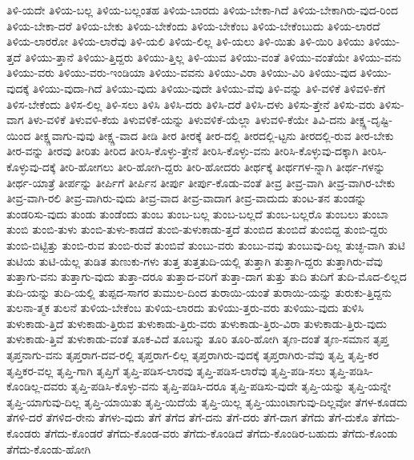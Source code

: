 {ತಿಳಿ-ಯದೇ
ತಿಳಿಯ-ಬಲ್ಲ
ತಿಳಿಯ-ಬಲ್ಲಂತಹ
ತಿಳಿಯ-ಬಾರದು
ತಿಳಿಯ-ಬೇಕಾ-ಗಿದೆ
ತಿಳಿಯ-ಬೇಕಾಗಿರು-ವುದ-ರಿಂದ
ತಿಳಿಯ-ಬೇಕಾ-ದರೆ
ತಿಳಿಯ-ಬೇಕು
ತಿಳಿಯ-ಬೇಕೆಂದು
ತಿಳಿಯ-ಬೇಕೆಂಬ
ತಿಳಿಯ-ಬೇಕೆಂಬುದು
ತಿಳಿಯ-ಲಾರದೆ
ತಿಳಿಯ-ಲಾರರೋ
ತಿಳಿಯ-ಲಾರೆವು
ತಿಳಿ-ಯಲಿ
ತಿಳಿಯ-ಲಿಲ್ಲ
ತಿಳಿ-ಯಲು
ತಿಳಿ-ಯಿತು
ತಿಳಿ-ಯಿರಿ
ತಿಳಿಯು
ತಿಳಿಯು-ತ್ತದೆ
ತಿಳಿಯು-ತ್ತಾನೆ
ತಿಳಿಯು-ತ್ತಿದ್ದರು
ತಿಳಿಯು-ತ್ತಿಲ್ಲ
ತಿಳಿ-ಯುವ
ತಿಳಿಯು-ವಂತೆ
ತಿಳಿಯು-ವಂತೆಯೇ
ತಿಳಿಯು-ವನು
ತಿಳಿಯು-ವರು
ತಿಳಿಯು-ವರು-ಇಂಡಿಯಾ
ತಿಳಿಯು-ವವನು
ತಿಳಿಯು-ವಿರಾ
ತಿಳಿಯು-ವಿರಿ
ತಿಳಿಯು-ವುದ
ತಿಳಿಯು-ವುದಕ್ಕೆ
ತಿಳಿಯು-ವುದಾ-ಗಿದೆ
ತಿಳಿಯು-ವುದು
ತಿಳಿಯು-ವುದೇ
ತಿಳಿಯು-ವೆವು
ತಿಳಿ-ವನ್ನು
ತಿಳಿ-ವಳಿಕೆ
ತಿಳಿವಳಿ-ಕೆಗೆ
ತಿಳಿಸ-ಬೇಕೆಂದು
ತಿಳಿಸ-ಲಿಲ್ಲ
ತಿಳಿ-ಸಲು
ತಿಳಿಸಿ
ತಿಳಿಸಿ-ದರು
ತಿಳಿಸಿ-ದರೆ
ತಿಳಿಸಿ-ದಳು
ತಿಳಿಸು-ತ್ತೇನೆ
ತಿಳಿಸು-ವರು
ತಿಳಿಸು-ವಾಗ
ತಿಳು-ವಳಿಕೆ
ತಿಳುವಳಿ-ಕೆಯ
ತಿಳುವಳಿಕೆ-ಯನ್ನು
ತಿಳುವಳಿಕೆ-ಯೆಲ್ಲಾ
ತಿಳುವಳಿ-ಕೆಯೇ
ತಿವಿ-ದನು
ತೀಕ್ಷ್ಣ-ದೃಷ್ಟಿ-ಯಿಂದ
ತೀಕ್ಷ್ಣವಾಗು-ವುವು
ತೀಕ್ಷ್ಣ-ವಾದ
ತೀಡಿ
ತೀರ
ತೀರಕ್ಕೆ
ತೀರ-ದಲ್ಲಿ
ತೀರದಲ್ಲಿ-ಟ್ಟನು
ತೀರದಲ್ಲಿ-ರುವ
ತೀರ-ಬೇಕು
ತೀರ-ವನ್ನು
ತೀರವು
ತೀರಿತು
ತೀರಿದ
ತೀರಿಸಿ-ಕೊಳ್ಳು-ತ್ತೇನೆ
ತೀರಿಸಿ-ಕೊಳ್ಳು-ವನು
ತೀರಿಸಿ-ಕೊಳ್ಳುವು-ದಕ್ಕಾಗಿ
ತೀರಿಸಿ-ಕೊಳ್ಳುವು-ದಕ್ಕೆ
ತೀರಿ-ಹೋಗಲು
ತೀರಿ-ಹೋಗಿ-ದ್ದರು
ತೀರಿ-ಹೋದರು
ತೀರ್ಥಕ್ಕೆ
ತೀರ್ಥಗಳ-ನ್ನಾಗಿ
ತೀರ್ಥ-ಗಳನ್ನು
ತೀರ್ಥ-ಯಾತ್ರೆ
ತೀರ್ಪನ್ನು
ತೀರ್ಪಿಗೆ
ತೀರ್ಪಿನ
ತೀರ್ಪು
ತೀರ್ಪು-ಕೊಡು-ವಂತೆ
ತೀವ್ರ
ತೀವ್ರ-ವಾಗಿ
ತೀವ್ರ-ವಾಗಿರ-ಬೇಕು
ತೀವ್ರ-ವಾಗಿ-ರಲಿ
ತೀವ್ರ-ವಾಗಿರು-ವುದು
ತೀವ್ರ-ವಾದ
ತೀವ್ರ-ವಾದಾಗ
ತೀವ್ರ-ವಾದುದು
ತುಂಟ-ತನ
ತುಂಡನ್ನು
ತುಂಡರಿಸು-ವುದು
ತುಂಡು
ತುಂಡೆಂದು
ತುಂಬ
ತುಂಬ-ಬಲ್ಲ
ತುಂಬ-ಬಲ್ಲದೆ
ತುಂಬ-ಬಲ್ಲರೊ
ತುಂಬಲು
ತುಂಬಾ
ತುಂಬಿ
ತುಂಬಿ-ತುಳು
ತುಂಬಿ-ತುಳು-ಕಾಡದೆ
ತುಂಬಿ-ತುಳುಕಾಡು-ತ್ತದೆ
ತುಂಬಿದ
ತುಂಬಿದೆ
ತುಂಬಿದ್ದ
ತುಂಬಿ-ದ್ದರು
ತುಂಬಿ-ಬಿಟ್ಟಿತ್ತು
ತುಂಬಿ-ರುವ
ತುಂಬಿ-ರುವೆ
ತುಂಬಿವೆ
ತುಂಬು-ವರು
ತುಂಬು-ವವು
ತುಂಬುವು-ದಿಲ್ಲ
ತುಚ್ಛ-ವಾಗಿ
ತುಟಿ
ತುಟಿಯ
ತುಟಿ-ಯೆಲ್ಲ
ತುಡಿತ
ತುಣುಕು-ಗಳು
ತುತ್ತ
ತುತ್ತತುದಿ-ಯಲ್ಲಿ
ತುತ್ತಾಗಿ
ತುತ್ತಾಗಿ-ದ್ದರು
ತುತ್ತಾಗಿರು-ವೆವು
ತುತ್ತಾಗು-ವನು
ತುತ್ತಾಗು-ವುದು
ತುತ್ತಾ-ದರೂ
ತುತ್ತಾದ-ವರಿಗೆ
ತುತ್ತಾ-ದಾಗ
ತುತ್ತು
ತುದಿ
ತುದಿಗೆ
ತುದಿ-ಮೊದ-ಲಿಲ್ಲದ
ತುದಿ-ಯನ್ನು
ತುದಿ-ಯಲ್ಲಿ
ತುಪ್ಪದ-ಸಾಗರ
ತುಮುಲ-ದಿಂದ
ತುರಾಯಿ-ಯಂತೆ
ತುರಾಯಿ-ಯನ್ನು
ತುರುಕು-ತ್ತಿದ್ದನು
ತುಲನಾ-ತ್ಮಕ
ತುಲನೆ
ತುಳಿಯ-ಬೇಕೆಂಬ
ತುಳಿಯ-ಲಾರದು
ತುಳಿಯು-ತ್ತರು-ವರು
ತುಳಿಯು-ವುದು
ತುಳಿಸಿ
ತುಳುಕಾಡು-ತ್ತಿದೆ
ತುಳುಕಾಡು-ತ್ತಿರುವ
ತುಳುಕಾಡು-ತ್ತಿರು-ವರು
ತುಳುಕಾಡು-ತ್ತಿರು-ವಿರಾ
ತುಳುಕಾಡು-ತ್ತಿರು-ವುದು
ತುಳುಕಾಡು-ತ್ತಿವೆ
ತುಳುಕಾಡು-ವಂತೆ
ತೂಕ-ವಿದೆ
ತೂಬನ್ನು
ತೂರಿ
ತೂರಿ-ಹೋಗಿ
ತೃಣ-ದಂತೆ
ತೃಣ-ಸಮಾನ
ತೃಪ್ತ
ತೃಪ್ತನಾಗು-ವನು
ತೃಪ್ತರಾಗ-ದವ-ರಲ್ಲಿ
ತೃಪ್ತರಾಗ-ಲಿಲ್ಲ
ತೃಪ್ತರಾಗಿರು-ವುದಕ್ಕೆ
ತೃಪ್ತರಾಗಿರು-ವೆವು
ತೃಪ್ತಿ
ತೃಪ್ತಿ-ಕರ
ತೃಪ್ತಿಕರ-ವಲ್ಲ
ತೃಪ್ತಿ-ಗಾಗಿ
ತೃಪ್ತಿಗೆ
ತೃಪ್ತಿ-ಪಡಿಸ-ಲಾರವು
ತೃಪ್ತಿ-ಪಡಿಸ-ಲಾರೆವು
ತೃಪ್ತಿ-ಪಡಿ-ಸಲು
ತೃಪ್ತಿ-ಪಡಿಸಿ-ಕೊಂಡಿಲ್ಲ-ದವರು
ತೃಪ್ತಿ-ಪಡಿಸಿ-ಕೊಳ್ಳು-ವನು
ತೃಪ್ತಿ-ಪಡಿಸಿ-ದರೂ
ತೃಪ್ತಿ-ಪಡಿಸು-ವುದೇ
ತೃಪ್ತಿ-ಯನ್ನು
ತೃಪ್ತಿ-ಯನ್ನೇ
ತೃಪ್ತಿ-ಯಾಗುವು-ದಿಲ್ಲ
ತೃಪ್ತಿ-ಯಾಯಿತು
ತೃಪ್ತಿ-ಯಿದೆಯೆ
ತೃಪ್ತಿ-ಯಿಲ್ಲ
ತೃಪ್ತಿ-ಯುಂಟಾಗುವು-ದಿಲ್ಲವೋ
ತೆಗಳ-ಕೂಡದು
ತೆಗಳಿ-ದರೆ
ತೆಗಳಿದ-ರೇನು
ತೆಗಳು-ವುದು
ತೆಗೆ
ತೆಗೆದ
ತೆಗೆ-ದನು
ತೆಗೆ-ದರು
ತೆಗೆ-ದಾಗ
ತೆಗೆದು
ತೆಗೆ-ದುಕೊ
ತೆಗೆದು-ಕೊಂಡರು
ತೆಗೆದು-ಕೊಂಡರೆ
ತೆಗೆದು-ಕೊಂಡ-ವರು
ತೆಗೆದು-ಕೊಂಡಿದೆ
ತೆಗೆದು-ಕೊಂಡಿರ-ಬಹುದು
ತೆಗೆದು-ಕೊಂಡು
ತೆಗೆದು-ಕೊಂಡು-ಹೋಗಿ
}
